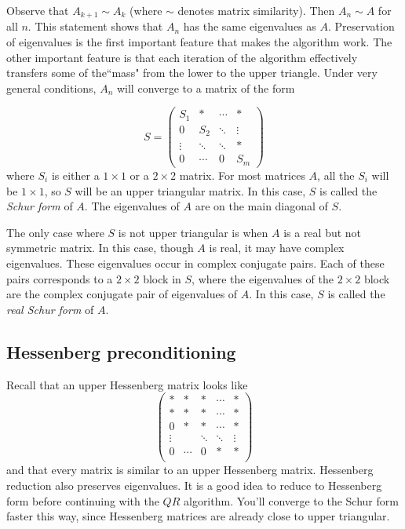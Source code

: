 Observe that $A_{k+1} \sim A_k$ (where $\sim$ denotes matrix similarity).
Then $A_n \sim A$ for all $n$.
This statement shows that $A_n$ has the same eigenvalues as $A$.
Preservation of eigenvalues is the first important feature that makes the algorithm work.
The other important feature is that each iteration of the algorithm effectively transfers some of the``mass" from the lower to the upper triangle.
Under very general conditions, $A_n$ will converge to a matrix of the form

\begin{equation*}
\label{eq:Schur form}
S =
     \begin{pmatrix}
          S_1 &* & \cdots & * \\
           0     &S_2  &  \ddots & \vdots \\
           \vdots  & \ddots & \ddots & *  \\
           0 & \cdots & 0 & S_m
    \end{pmatrix}
\end{equation*}
where $S_i$ is either a $1 \times 1$ or a $2 \times 2$ matrix.
For most matrices $A$, all the $S_i$ will be $1 \times 1$, so $S$ will be an upper triangular matrix.
In this case, $S$ is called the \emph{Schur form} of $A$.
The eigenvalues of $A$ are on the main diagonal of $S$.

The only case where $S$ is not upper triangular is when $A$ is a real but not symmetric matrix.
In this case, though $A$ is real, it may have complex eigenvalues.
These eigenvalues occur in complex conjugate pairs.
Each of these pairs corresponds to a $2 \times 2$ block in $S$, where the eigenvalues of the $2 \times 2$ block are the complex conjugate pair of eigenvalues of $A$.
In this case, $S$ is called the \emph{real Schur form} of $A$.

\subsection*{Hessenberg preconditioning}

Recall that an upper Hessenberg matrix looks like
\[
\begin{pmatrix}
* & * & * & \cdots & * \\
* & * & * & \cdots & * \\
0 & * & * & \cdots&* \\
\vdots & & \ddots & \ddots & \vdots \\
0 & \cdots & 0 & * & *\\
\end{pmatrix}
\]
and that every matrix is similar to an upper Hessenberg matrix.
Hessenberg reduction also preserves eigenvalues.
It is a good idea to reduce to Hessenberg form before continuing with the $QR$ algorithm.
You'll converge to the Schur form faster this way, since Hessenberg matrices are already close to upper triangular.

